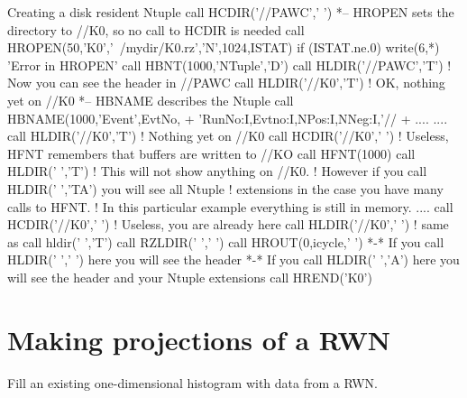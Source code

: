 \begin{changebar}
\begin{XMPt}{Creating a disk resident Ntuple}
      call HCDIR('//PAWC',' ')
*--     HROPEN sets the directory to //K0, so no call to HCDIR is needed
      call HROPEN(50,'K0','~/mydir/K0.rz','N',1024,ISTAT)
      if (ISTAT.ne.0) write(6,*) 'Error in HROPEN'
      call HBNT(1000,'NTuple','D')
      call HLDIR('//PAWC','T') ! Now you can see the header in //PAWC
      call HLDIR('//K0','T')   ! OK, nothing yet on //K0
*--     HBNAME describes the Ntuple
      call HBNAME(1000,'Event',EvtNo,
     +            'RunNo:I,Evtno:I,NPos:I,NNeg:I,'//
     +            ....
....
        call HLDIR('//K0','T') ! Nothing yet on //K0
        call HCDIR('//K0',' ') ! Useless, HFNT remembers that buffers are written to //KO
        call HFNT(1000)
        call HLDIR(' ','T')    ! This will not show anything on //K0.
                               ! However if you call HLDIR(' ','TA') you will see all Ntuple 
                               ! extensions in the case you have many calls to HFNT. 
                               ! In this particular example everything is still in memory.
....
      call HCDIR('//K0',' ')   ! Useless, you are already here
      call HLDIR('//K0',' ')   ! same as call hldir(' ','T')
      call RZLDIR(' ',' ')
      call HROUT(0,icycle,' ')
*-*      If you call HLDIR(' ',' ') here you will see the header
*-*      If you call HLDIR(' ','A') here you will see the header and your Ntuple extensions
      call HREND('K0')
\end{XMPt}
\end{changebar}

\newpage%

\section{Making projections of a RWN}
\label{HNTUPROJ} 

 
\Action
Fill an existing one-dimensional histogram with data from a RWN.
 
